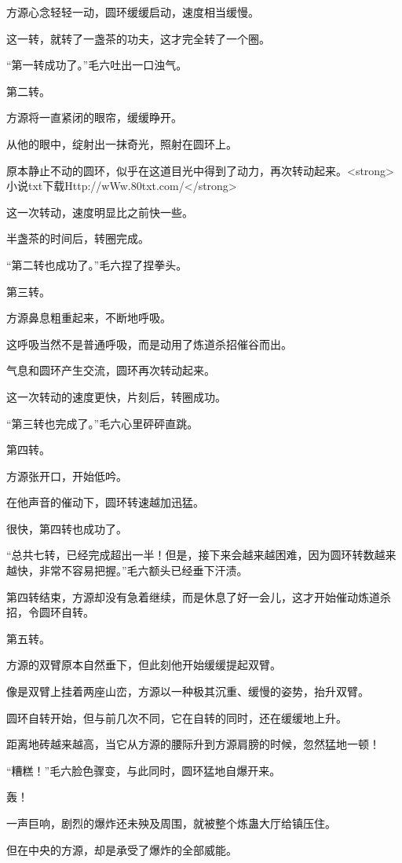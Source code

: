 \begin{this_body}
方源心念轻轻一动，圆环缓缓启动，速度相当缓慢。

这一转，就转了一盏茶的功夫，这才完全转了一个圈。

“第一转成功了。”毛六吐出一口浊气。

第二转。

方源将一直紧闭的眼帘，缓缓睁开。

从他的眼中，绽射出一抹奇光，照射在圆环上。

原本静止不动的圆环，似乎在这道目光中得到了动力，再次转动起来。<strong>小说txt下载Http://wWw.80txt.com/</strong>

这一次转动，速度明显比之前快一些。

半盏茶的时间后，转圈完成。

“第二转也成功了。”毛六捏了捏拳头。

第三转。

方源鼻息粗重起来，不断地呼吸。

这呼吸当然不是普通呼吸，而是动用了炼道杀招催谷而出。

气息和圆环产生交流，圆环再次转动起来。

这一次转动的速度更快，片刻后，转圈成功。

“第三转也完成了。”毛六心里砰砰直跳。

第四转。

方源张开口，开始低吟。

在他声音的催动下，圆环转速越加迅猛。

很快，第四转也成功了。

“总共七转，已经完成超出一半！但是，接下来会越来越困难，因为圆环转数越来越快，非常不容易把握。”毛六额头已经垂下汗渍。

第四转结束，方源却没有急着继续，而是休息了好一会儿，这才开始催动炼道杀招，令圆环自转。

第五转。

方源的双臂原本自然垂下，但此刻他开始缓缓提起双臂。

像是双臂上挂着两座山峦，方源以一种极其沉重、缓慢的姿势，抬升双臂。

圆环自转开始，但与前几次不同，它在自转的同时，还在缓缓地上升。

距离地砖越来越高，当它从方源的腰际升到方源肩膀的时候，忽然猛地一顿！

“糟糕！”毛六脸色骤变，与此同时，圆环猛地自爆开来。

轰！

一声巨响，剧烈的爆炸还未殃及周围，就被整个炼蛊大厅给镇压住。

但在中央的方源，却是承受了爆炸的全部威能。


\end{this_body}
